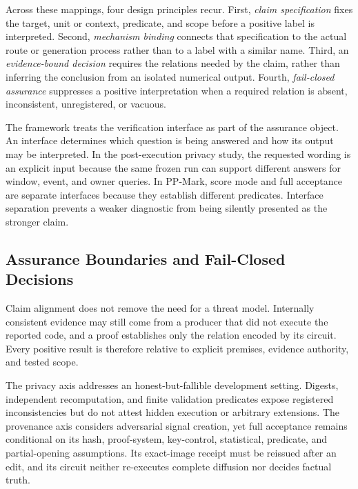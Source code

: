 Across these mappings, four design principles recur.  First, \emph{claim specification}
fixes the target, unit or context, predicate, and scope before a positive label is
interpreted.  Second, \emph{mechanism binding} connects that specification to the
actual route or generation process rather than to a label with a similar name.
Third, an \emph{evidence-bound decision} requires the relations needed by the
claim, rather than inferring the conclusion from an isolated numerical output.
Fourth, \emph{fail-closed assurance} suppresses a positive interpretation when a
required relation is absent, inconsistent, unregistered, or vacuous.

\clearpage

The framework treats the verification interface as part of the assurance object.
An interface determines which question is being answered and how its output may
be interpreted.  In the post-execution privacy study, the requested wording is an
explicit input because the same frozen run can support different answers for
window, event, and owner queries.  In PP-Mark, score mode and full acceptance are
separate interfaces because they establish different predicates.  Interface
separation prevents a weaker diagnostic from being silently presented as the
stronger claim.

\subsection{Assurance Boundaries and Fail-Closed Decisions}
\label{subsec:ch1-boundaries}

Claim alignment does not remove the need for a threat model.  Internally
consistent evidence may still come from a producer that did not execute the
reported code, and a proof establishes only the relation encoded by its circuit.
Every positive result is therefore relative to explicit premises, evidence
authority, and tested scope.

The privacy axis addresses an honest-but-fallible development setting.  Digests,
independent recomputation, and finite validation predicates expose registered
inconsistencies but do not attest hidden execution or arbitrary extensions.
The provenance axis considers adversarial signal creation, yet full acceptance
remains conditional on its hash, proof-system, key-control, statistical,
predicate, and partial-opening assumptions.  Its exact-image receipt must be
reissued after an edit, and its circuit neither re-executes complete diffusion nor
decides factual truth.

